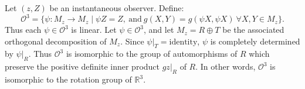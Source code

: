 Let $(z, Z)$ be an instantaneous observer. Define:
$$
\mathcal{O}^3 = \{\psi: M_z \rightarrow M_z \mid \psi Z = Z,\ \text{and}\ g(X, Y) = g(\psi X, \psi X)\ \forall X, Y \in M_z\}.
$$
Thus each $\psi \in \mathcal{O}^3$ is linear. Let $\psi \in \mathcal{O}^3$, and let $M_z = R \oplus T$ be the associated orthogonal decomposition of $M_z$. Since $\psi|_T = \text{identity}$, $\psi$ is completely determined by $\psi|_R$. Thus $\mathcal{O}^3$ is isomorphic to the group of automorphisms of $R$ which preserve the positive definite inner product $gz|_R$ of $R$. In other words, $\mathcal{O}^3$ is isomorphic to the rotation group of $\mathbb{R}^3$.

